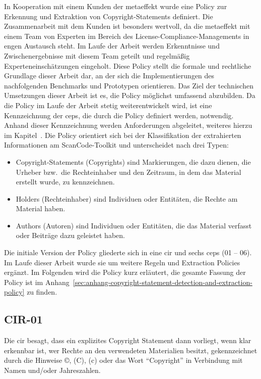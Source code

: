 In Kooperation mit einem Kunden der metaeffekt wurde eine Policy zur Erkennung und Extraktion von Copyright-Statements definiert.
Die Zusammenarbeit mit dem Kunden ist besonders wertvoll, da die metaeffekt mit einem Team von Experten im Bereich des License-Compliance-Managements in engen Austausch steht.
Im Laufe der Arbeit werden Erkenntnisse und Zwischenergebnisse mit diesem Team geteilt und regelmäßig Experteneinschätzungen eingeholt.
Diese Policy stellt die formale und rechtliche Grundlage dieser Arbeit dar, an der sich die Implementierungen des nachfolgenden Benchmarks und Prototypen orientieren.
Das Ziel der technischen Umsetzungen dieser Arbeit ist es, die Policy möglichst umfassend abzubilden.
Da die Policy im Laufe der Arbeit stetig weiterentwickelt wird, ist eine Kennzeichnung der \glspl{cep}, die durch die Policy definiert werden, notwendig.
Anhand dieser Kennzeichnung werden Anforderungen abgeleitet, weiteres hierzu im Kapitel~.
Die Policy orientiert sich bei der Klassifikation der extrahierten Informationen am ScanCode-Toolkit und unterscheidet nach drei Typen:
\begin{itemize}
    \item Copyright-Statements (Copyrights) sind Markierungen, die dazu dienen, die Urheber bzw.\ die Rechteinhaber und den Zeitraum, in dem das Material erstellt wurde, zu kennzeichnen.
    \item Holders (Rechteinhaber) sind Individuen oder Entitäten, die Rechte am Material haben.
    \item Authors (Autoren) sind Individuen oder Entitäten, die das Material verfasst oder Beiträge dazu geleistet haben.
\end{itemize}

Die initiale Version der Policy gliederte sich in eine \gls{cir} und sechs \glspl{cep} (01 -- 06).
Im Laufe dieser Arbeit wurde sie um weitere Regeln und Extraction Policies ergänzt.
Im Folgenden wird die Policy kurz erläutert, die gesamte Fassung der Policy ist im Anhang~\ref{sec:anhang-copyright-statement-detection-and-extraction-policy} zu finden.


\subsection{CIR-01}\label{subsec:cir-01}

Die \gls{cir} besagt, dass ein explizites Copyright Statement dann vorliegt, wenn klar erkennbar ist, wer Rechte an den verwendeten Materialien besitzt, gekennzeichnet durch die Hinweise ©, (C), (c) oder das Wort \enquote{Copyright} in Verbindung mit Namen und/oder Jahreszahlen.

